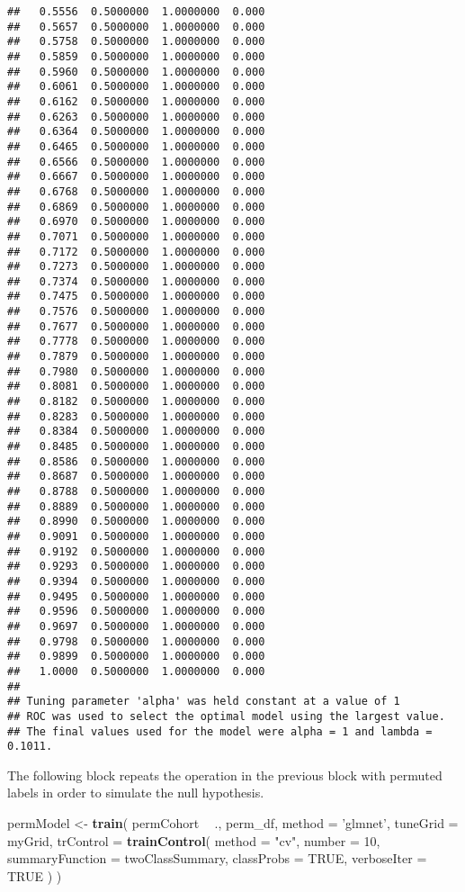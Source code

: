 \documentclass[]{article}
\newenvironment{Shaded}{\begin{snugshade}}{\end{snugshade}}
\newcommand{\KeywordTok}[1]{\textcolor[rgb]{0.13,0.29,0.53}{\textbf{#1}}}
\newcommand{\DataTypeTok}[1]{\textcolor[rgb]{0.13,0.29,0.53}{#1}}
\newcommand{\DecValTok}[1]{\textcolor[rgb]{0.00,0.00,0.81}{#1}}
\newcommand{\StringTok}[1]{\textcolor[rgb]{0.31,0.60,0.02}{#1}}
\newcommand{\OtherTok}[1]{\textcolor[rgb]{0.56,0.35,0.01}{#1}}
\newcommand{\OperatorTok}[1]{\textcolor[rgb]{0.81,0.36,0.00}{\textbf{#1}}}
\newcommand{\NormalTok}[1]{#1}
\begin{document}
\begin{verbatim}
##   0.5556  0.5000000  1.0000000  0.000
##   0.5657  0.5000000  1.0000000  0.000
##   0.5758  0.5000000  1.0000000  0.000
##   0.5859  0.5000000  1.0000000  0.000
##   0.5960  0.5000000  1.0000000  0.000
##   0.6061  0.5000000  1.0000000  0.000
##   0.6162  0.5000000  1.0000000  0.000
##   0.6263  0.5000000  1.0000000  0.000
##   0.6364  0.5000000  1.0000000  0.000
##   0.6465  0.5000000  1.0000000  0.000
##   0.6566  0.5000000  1.0000000  0.000
##   0.6667  0.5000000  1.0000000  0.000
##   0.6768  0.5000000  1.0000000  0.000
##   0.6869  0.5000000  1.0000000  0.000
##   0.6970  0.5000000  1.0000000  0.000
##   0.7071  0.5000000  1.0000000  0.000
##   0.7172  0.5000000  1.0000000  0.000
##   0.7273  0.5000000  1.0000000  0.000
##   0.7374  0.5000000  1.0000000  0.000
##   0.7475  0.5000000  1.0000000  0.000
##   0.7576  0.5000000  1.0000000  0.000
##   0.7677  0.5000000  1.0000000  0.000
##   0.7778  0.5000000  1.0000000  0.000
##   0.7879  0.5000000  1.0000000  0.000
##   0.7980  0.5000000  1.0000000  0.000
##   0.8081  0.5000000  1.0000000  0.000
##   0.8182  0.5000000  1.0000000  0.000
##   0.8283  0.5000000  1.0000000  0.000
##   0.8384  0.5000000  1.0000000  0.000
##   0.8485  0.5000000  1.0000000  0.000
##   0.8586  0.5000000  1.0000000  0.000
##   0.8687  0.5000000  1.0000000  0.000
##   0.8788  0.5000000  1.0000000  0.000
##   0.8889  0.5000000  1.0000000  0.000
##   0.8990  0.5000000  1.0000000  0.000
##   0.9091  0.5000000  1.0000000  0.000
##   0.9192  0.5000000  1.0000000  0.000
##   0.9293  0.5000000  1.0000000  0.000
##   0.9394  0.5000000  1.0000000  0.000
##   0.9495  0.5000000  1.0000000  0.000
##   0.9596  0.5000000  1.0000000  0.000
##   0.9697  0.5000000  1.0000000  0.000
##   0.9798  0.5000000  1.0000000  0.000
##   0.9899  0.5000000  1.0000000  0.000
##   1.0000  0.5000000  1.0000000  0.000
## 
## Tuning parameter 'alpha' was held constant at a value of 1
## ROC was used to select the optimal model using the largest value.
## The final values used for the model were alpha = 1 and lambda = 0.1011.
\end{verbatim}

The following block repeats the operation in the previous block with
permuted labels in order to simulate the null hypothesis.

\begin{Shaded}
\begin{Highlighting}[]
\NormalTok{permModel <-}\StringTok{ }\KeywordTok{train}\NormalTok{(}
\NormalTok{  permCohort }\OperatorTok{~}\StringTok{ }\NormalTok{., }
\NormalTok{  perm_df, }
  \DataTypeTok{method =} \StringTok{'glmnet'}\NormalTok{,}
  \DataTypeTok{tuneGrid =}\NormalTok{ myGrid,}
  \DataTypeTok{trControl =} \KeywordTok{trainControl}\NormalTok{(}
    \DataTypeTok{method =} \StringTok{"cv"}\NormalTok{,}
    \DataTypeTok{number =} \DecValTok{10}\NormalTok{,}
    \DataTypeTok{summaryFunction =}\NormalTok{ twoClassSummary,}
    \DataTypeTok{classProbs =} \OtherTok{TRUE}\NormalTok{,}
    \DataTypeTok{verboseIter =} \OtherTok{TRUE}
\NormalTok{  )}
\NormalTok{)}
\end{Highlighting}
\end{Shaded}
\end{document}
